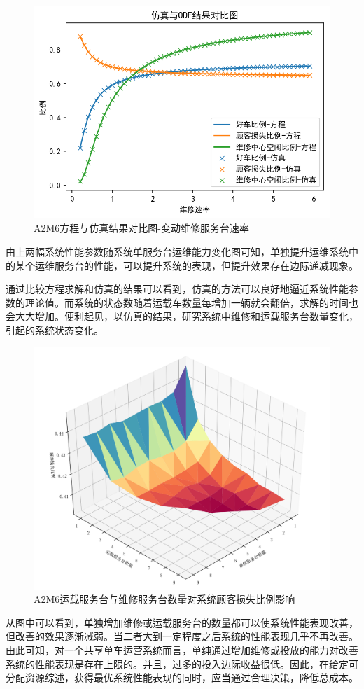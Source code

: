 \documentclass{article}
\begin{document}
\begin{figure}[H]
    \centering
    \includegraphics[scale=0.5]{A2M6仿真-odeSingleVaryMu.png}
    \caption{A2M6方程与仿真结果对比图-变动维修服务台速率}
    \label{fig:cenmodel}
\end{figure}
由上两幅系统性能参数随系统单服务台运维能力变化图可知，单独提升运维系统中的某个运维服务台的性能，可以提升系统的表现，但提升效果存在边际递减现象。

通过比较方程求解和仿真的结果可以看到，仿真的方法可以良好地逼近系统性能参数的理论值。而系统的状态数随着运载车数量每增加一辆就会翻倍，求解的时间也会大大增加。便利起见，以仿真的结果，研究系统中维修和运载服务台数量变化，引起的系统状态变化。
\begin{figure}[H]
    \centering
    \includegraphics[scale=0.5]{A2M6VaryVN.png}
    \caption{A2M6运载服务台与维修服务台数量对系统顾客损失比例影响}
    \label{fig:cenmodel}
\end{figure}
从图中可以看到，单独增加维修或运载服务台的数量都可以使系统性能表现改善，但改善的效果逐渐减弱。当二者大到一定程度之后系统的性能表现几乎不再改善。由此可知，对一个共享单车运营系统而言，单纯通过增加维修或投放的能力对改善系统的性能表现是存在上限的。并且，过多的投入边际收益很低。因此，在给定可分配资源综述，获得最优系统性能表现的同时，应当通过合理决策，降低总成本。
\end{document}
